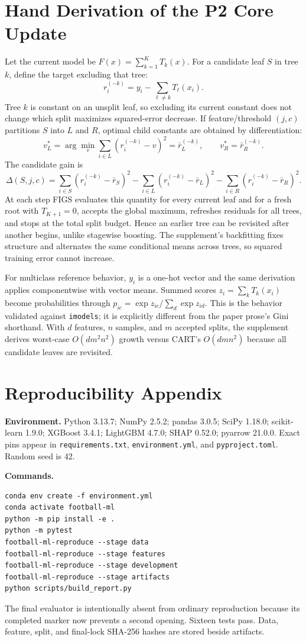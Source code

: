 \documentclass[10pt]{article}
\begin{document}
\clearpage
\appendix
\section{Hand Derivation of the P2 Core Update}

Let the current model be $F(x)=\sum_{k=1}^{K}T_k(x)$. For a candidate leaf $S$ in tree $k$, define the target excluding that tree:
\[
r_i^{(-k)}=y_i-\sum_{\ell\ne k}T_\ell(x_i).
\]
Tree $k$ is constant on an unsplit leaf, so excluding its current constant does not change which split maximizes squared-error decrease. If feature/threshold $(j,c)$ partitions $S$ into $L$ and $R$, optimal child constants are obtained by differentiation:
\[
v_L^*=\arg\min_v\sum_{i\in L}(r_i^{(-k)}-v)^2=\bar r_L^{(-k)},\qquad
v_R^*=\bar r_R^{(-k)}.
\]
The candidate gain is
\[
\Delta(S,j,c)=\sum_{i\in S}(r_i^{(-k)}-\bar r_S)^2-
\sum_{i\in L}(r_i^{(-k)}-\bar r_L)^2-
\sum_{i\in R}(r_i^{(-k)}-\bar r_R)^2.
\]
At each step FIGS evaluates this quantity for every current leaf and for a fresh root with $T_{K+1}=0$, accepts the global maximum, refreshes residuals for all trees, and stops at the total split budget. Hence an earlier tree can be revisited after another begins, unlike stagewise boosting. The supplement's backfitting fixes structure and alternates the same conditional means across trees, so squared training error cannot increase.

For multiclass reference behavior, $y_i$ is a one-hot vector and the same derivation applies componentwise with vector means. Summed scores $z_i=\sum_kT_k(x_i)$ become probabilities through $p_{ic}=\exp z_{ic}/\sum_d\exp z_{id}$. This is the behavior validated against \texttt{imodels}; it is explicitly different from the paper prose's Gini shorthand. With $d$ features, $n$ samples, and $m$ accepted splits, the supplement derives worst-case $O(dm^2n^2)$ growth versus CART's $O(dmn^2)$ because all candidate leaves are revisited.

\section{Reproducibility Appendix}

\textbf{Environment.} Python 3.13.7; NumPy 2.5.2; pandas 3.0.5; SciPy 1.18.0; scikit-learn 1.9.0; XGBoost 3.4.1; LightGBM 4.7.0; SHAP 0.52.0; pyarrow 21.0.0. Exact pins appear in \texttt{requirements.txt}, \texttt{environment.yml}, and \texttt{pyproject.toml}. Random seed is 42.

\textbf{Commands.}
\begin{verbatim}
conda env create -f environment.yml
conda activate football-ml
python -m pip install -e .
python -m pytest
football-ml-reproduce --stage data
football-ml-reproduce --stage features
football-ml-reproduce --stage development
football-ml-reproduce --stage artifacts
python scripts/build_report.py
\end{verbatim}
The final evaluator is intentionally absent from ordinary reproduction because its completed marker now prevents a second opening. Sixteen tests pass. Data, feature, split, and final-lock SHA-256 hashes are stored beside artifacts.
\end{document}
